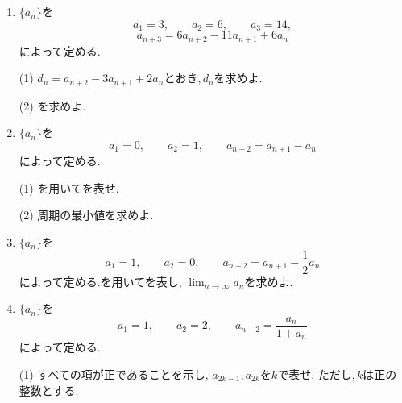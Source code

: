 \begin{enumerate}[label=\textbf{問\arabic*.},leftmargin=3.8em,format=\bookitemlink{practice-special}{problem}{answer}]
                によって定める.
                \par\smallskip\noindent
                (1) $\displaystyle d_n=a_{n+2}-2a_{n+1}+a_n$とおき,\,$\displaystyle d_n$を求めよ.
                \par\smallskip\noindent
                (2) を求めよ.
          \item {}$\displaystyle \{a_n\}$を
                \[
                  a_1=3,\qquad a_2=6,\qquad a_3=14,
                \]
                \[
                  a_{n+3}=6a_{n+2}-11a_{n+1}+6a_n
                \]
                によって定める.
                \par\smallskip\noindent
                (1) $\displaystyle d_n=a_{n+2}-3a_{n+1}+2a_n$とおき,\,$\displaystyle d_n$を求めよ.
                \par\smallskip\noindent
                (2) を求めよ.
          \item {}$\displaystyle \{a_n\}$を
                \[
                  a_1=0,\qquad a_2=1,\qquad
                  a_{n+2}=a_{n+1}-a_n
                \]
                によって定める.
                \par\smallskip\noindent
                (1) を用いてを表せ.
                \par\smallskip\noindent
                (2) 周期の最小値を求めよ.
          \item {}$\displaystyle \{a_n\}$を
                \[
                  a_1=1,\qquad a_2=0,\qquad
                  a_{n+2}=a_{n+1}-\frac12a_n
                \]
                によって定める.を用いてを表し,
                $\displaystyle \lim_{n\to\infty}a_n$を求めよ.
          \item {}$\displaystyle \{a_n\}$を
                \[
                  a_1=1,\qquad a_2=2,\qquad
                  a_{n+2}=\frac{a_n}{1+a_n}
                \]
                によって定める.
                \par\smallskip\noindent
                (1) すべての項が正であることを示し,
                $\displaystyle a_{2k-1},a_{2k}$を$\displaystyle k$で表せ.
                ただし,\,$\displaystyle k$は正の整数とする.

\end{enumerate}
